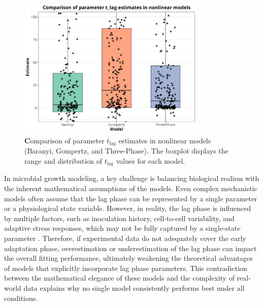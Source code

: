 \documentclass[12pt]{article}
\begin{document}
\begin{figure}[htbp]
    \centering
    \includegraphics[width=0.8\textwidth]{../results/nonlinear_parameter_comparison_t_lag.png}
    \caption{%
        \textbf Comparison of parameter \(t_{\mathrm{lag}}\) estimates in nonlinear models
        (Baranyi, Gompertz, and Three-Phase). The boxplot displays the range and distribution of
        \(t_{\mathrm{lag}}\) values for each model.
    }
    \label{fig:t_lag_estimates}
\end{figure}
In microbial growth modeling, a key challenge is balancing biological realism with the inherent mathematical assumptions of the models. Even complex mechanistic models often assume that the lag phase can be represented by a single parameter or a physiological state variable. However, in reality, the lag phase is influenced by multiple factors, such as inoculation history, cell-to-cell variability, and adaptive stress responses, which may not be fully captured by a single-state parameter \citep{BaranyiRoberts1994}. Therefore, if experimental data do not adequately cover the early adaptation phase, overestimation or underestimation of the lag phase can impact the overall fitting performance, ultimately weakening the theoretical advantages of models that explicitly incorporate lag phase parameters. This contradiction between the mathematical elegance of these models and the complexity of real-world data explains why no single model consistently performs best under all conditions.
\end{document}
